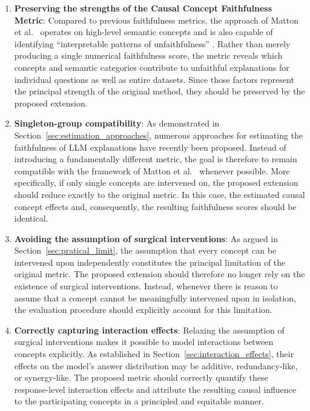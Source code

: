 \begin{enumerate}[
		label=\textbf{R\arabic*},
		ref=R\arabic*,
		wide=0pt,
		leftmargin=0pt
	]
	\item \label{req:preserving_strengths} \textbf{Preserving the strengths of the Causal Concept Faithfulness Metric}:
	      Compared to previous faithfulness metrics, the approach of Matton et al.~\cite{mattonWalkTalkMeasuring2024} operates on high-level semantic concepts and is also capable of identifying \enquote{interpretable patterns of unfaithfulness} \cite{mattonWalkTalkMeasuring2024}. Rather than merely producing a single numerical faithfulness score, the metric reveals which concepts and semantic categories contribute to unfaithful explanations for individual questions as well as entire datasets. Since those factors represent the principal strength of the original method, they should be preserved by the proposed extension.

	\item \label{req:one_item_group} \textbf{Singleton-group compatibility}:
	      As demonstrated in Section~\ref{sec:estimation_approaches}, numerous approaches for estimating the faithfulness of LLM explanations have recently been proposed. Instead of introducing a fundamentally different metric, the goal is therefore to remain compatible with the framework of Matton et al.~\cite{mattonWalkTalkMeasuring2024} whenever possible. More specifically, if only single concepts are intervened on, the proposed extension should reduce exactly to the original metric. In this case, the estimated causal concept effects and, consequently, the resulting faithfulness scores should be identical.

	\item \label{req:no_surgical} \textbf{Avoiding the assumption of surgical interventions}:
	      As argued in Section~\ref{sec:pratical_limit}, the assumption that every concept can be intervened upon independently constitutes the principal limitation of the original metric. The proposed extension should therefore no longer rely on the existence of surgical interventions. Instead, whenever there is reason to assume that a concept cannot be meaningfully intervened upon in isolation, the evaluation procedure should explicitly account for this limitation.

	\item \label{req:caputure_interaction} \textbf{Correctly capturing interaction effects}:
	      Relaxing the assumption of surgical interventions makes it possible to model interactions between concepts explicitly. As established in Section~\ref{sec:interaction_effects}, their effects on the model's answer distribution may be additive, redundancy-like, or synergy-like. The proposed metric should correctly quantify these response-level interaction effects and attribute the resulting causal influence to the participating concepts in a principled and equitable manner.


\end{enumerate}

